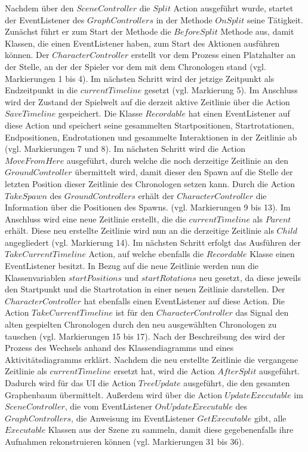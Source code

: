 Nachdem über den $SceneController$ die $Split$ Action ausgeführt wurde, startet der EventListener des $GraphControllers$ in der Methode $OnSplit$ seine Tätigkeit. Zunächst führt er zum Start der Methode die $BeforeSplit$ Methode aus, damit  Klassen, die einen EventListener haben, zum Start des  Aktionen ausführen können. Der $CharacterController$ erstellt vor dem  Prozess einen Platzhalter an der Stelle, an der der Spieler vor dem  mit dem Chronologen stand (vgl. Markierungen 1 bis 4). Im nächsten Schritt wird der jetzige Zeitpunkt als Endzeitpunkt in die $currentTimeline$ gesetzt (vgl. Markierung 5). Im Anschluss wird der Zustand der Spielwelt auf die derzeit aktive Zeitlinie über die Action $SaveTimeline$ gespeichert. Die Klasse $Recordable$ hat einen EventListener auf diese Action und speichert seine gesammelten Startpositionen, Startrotationen, Endpositionen, Endrotationen und gesammelte Interaktionen in der Zeitlinie ab (vgl. Markierungen 7 und 8). Im nächsten Schritt wird die Action $MoveFromHere$ ausgeführt, durch welche die noch derzeitige Zeitlinie an den $GroundController$ übermittelt wird, damit dieser den Spawn auf die Stelle der letzten Position dieser Zeitlinie des Chronologen setzen kann. Durch die Action $TakeSpawn$ des $GroundControllers$ erhält der $CharacterController$ die Information über die Positionen des Spawns. (vgl. Markierungen 9 bis 13). Im Anschluss wird eine neue Zeitlinie erstellt, die die $currentTimeline$ als $Parent$ erhält. Diese neu erstellte Zeitlinie wird nun an die derzeitige Zeitlinie als $Child$ angegliedert (vgl. Markierung 14).
Im nächsten Schritt erfolgt das Ausführen der $TakeCurrentTimeline$ Action, auf welche ebenfalls die $Recordable$ Klasse einen EventListener besitzt. In Bezug auf die neue Zeitlinie werden nun die Klassenvariablen $startPositions$ und $startRotations$ neu gesetzt, da diese jeweils den Startpunkt und die Startrotation in einer neuen Zeitlinie darstellen. Der $CharacterController$ hat ebenfalls einen EventListener auf diese Action. Die Action $TakeCurrentTimeline$ ist für den $CharacterController$ das Signal den alten gespielten Chronologen durch den neu ausgewählten Chronologen zu tauschen (vgl. Markierungen 15 bis 17). Nach der Beschreibung des  wird der Prozess des Wechsels anhand des Klassendiagramms und eines Aktivitätsdiagramms erklärt. Nachdem die neu erstellte Zeitlinie die vergangene Zeitlinie als $currentTimeline$ ersetzt hat, wird die Action $AfterSplit$ ausgeführt. Dadurch wird für das \ac{UI} die Action $TreeUpdate$ ausgeführt, die den gesamten Graphenbaum übermittelt. Außerdem wird über die Action $UpdateExecutable$ im $SceneController$, die vom EventListener $OnUpdateExecutable$ des $GraphControllers$, die Anweisung im EventListener $GetExecutable$ gibt, alle $Executable$ Klassen aus der Szene zu sammeln, damit diese gegebenenfalls ihre Aufnahmen rekonstruieren können (vgl. Markierungen 31 bis 36).



